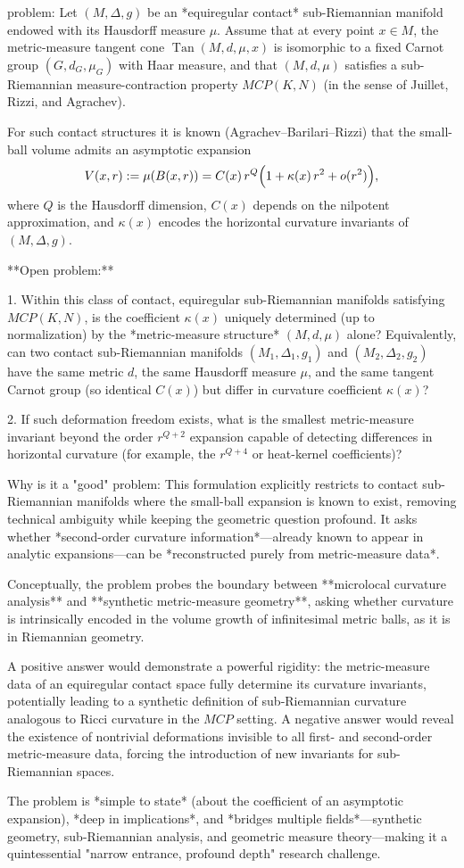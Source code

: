 problem:  
Let \((M,\Delta,g)\) be an *equiregular contact* sub-Riemannian manifold endowed with its Hausdorff measure \(\mu\).  
Assume that at every point \(x\in M\), the metric-measure tangent cone \(\operatorname{Tan}(M,d,\mu,x)\) is isomorphic to a fixed Carnot group \((G,d_G,\mu_G)\) with Haar measure, and that \((M,d,\mu)\) satisfies a sub-Riemannian measure-contraction property \(MCP(K,N)\) (in the sense of Juillet, Rizzi, and Agrachev).  

For such contact structures it is known (Agrachev–Barilari–Rizzi) that the small-ball volume admits an asymptotic expansion  
\[
V(x,r):=\mu(B(x,r)) = C(x)\,r^{Q}\Bigl(1 + \kappa(x)\,r^2 + o(r^2)\Bigr),
\]
where \(Q\) is the Hausdorff dimension, \(C(x)\) depends on the nilpotent approximation, and \(\kappa(x)\) encodes the horizontal curvature invariants of \((M,\Delta,g)\).  

**Open problem:**  

1. Within this class of contact, equiregular sub-Riemannian manifolds satisfying \(MCP(K,N)\), is the coefficient \(\kappa(x)\) uniquely determined (up to normalization) by the *metric-measure structure* \((M,d,\mu)\) alone?  
Equivalently, can two contact sub-Riemannian manifolds \((M_1,\Delta_1,g_1)\) and \((M_2,\Delta_2,g_2)\) have the same metric \(d\), the same Hausdorff measure \(\mu\), and the same tangent Carnot group (so identical \(C(x)\)) but differ in curvature coefficient \(\kappa(x)\)?  

2. If such deformation freedom exists, what is the smallest metric-measure invariant beyond the order \(r^{Q+2}\) expansion capable of detecting differences in horizontal curvature (for example, the \(r^{Q+4}\) or heat-kernel coefficients)?  

Why is it a "good" problem:  
This formulation explicitly restricts to contact sub-Riemannian manifolds where the small-ball expansion is known to exist, removing technical ambiguity while keeping the geometric question profound. It asks whether *second-order curvature information*—already known to appear in analytic expansions—can be *reconstructed purely from metric-measure data*.  

Conceptually, the problem probes the boundary between **microlocal curvature analysis** and **synthetic metric-measure geometry**, asking whether curvature is intrinsically encoded in the volume growth of infinitesimal metric balls, as it is in Riemannian geometry.  

A positive answer would demonstrate a powerful rigidity: the metric-measure data of an equiregular contact space fully determine its curvature invariants, potentially leading to a synthetic definition of sub-Riemannian curvature analogous to Ricci curvature in the \(MCP\) setting.  
A negative answer would reveal the existence of nontrivial deformations invisible to all first- and second-order metric-measure data, forcing the introduction of new invariants for sub-Riemannian spaces.  

The problem is *simple to state* (about the coefficient of an asymptotic expansion), *deep in implications*, and *bridges multiple fields*—synthetic geometry, sub-Riemannian analysis, and geometric measure theory—making it a quintessential "narrow entrance, profound depth" research challenge.